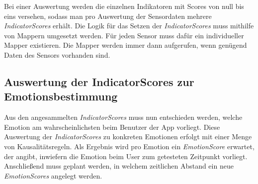 Bei einer Auswertung werden die einzelnen Indikatoren mit Scores von null bis eins versehen, sodass man pro Auswertung der Sensordaten mehrere \textit{IndicatorScores} erhält. Die Logik für das Setzen der \textit{IndicatorScores} muss mithilfe von Mappern umgesetzt werden. Für jeden Sensor muss dafür ein individueller Mapper existieren. Die Mapper werden immer dann aufgerufen, wenn genügend Daten des Sensors vorhanden sind. \newline
\subsection{Auswertung der IndicatorScores zur Emotionsbestimmung}
Aus den angesammelten \textit{IndicatorScores} muss nun entschieden werden, welche Emotion am wahrscheinlichsten beim Benutzer der App vorliegt. Diese Auswertung der \textit{IndicatorScores} zu konkreten Emotionen erfolgt mit einer Menge von Kausalitätsregeln. Als Ergebnis wird pro Emotion ein \textit{EmotionScore} erwartet, der angibt, inwiefern die Emotion beim User zum getesteten Zeitpunkt vorliegt. Anschließend muss geplant werden, in welchem zeitlichen Abstand ein neue \textit{EmotionScores} angelegt werden.
